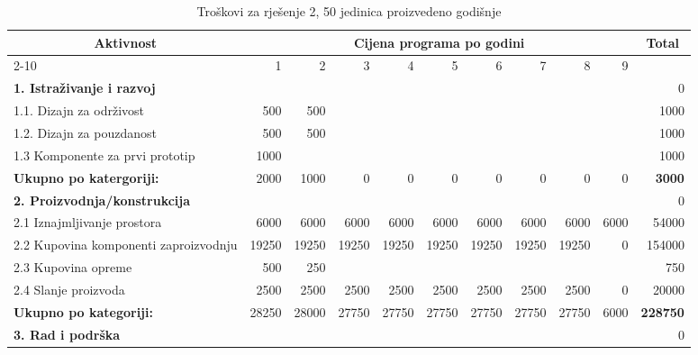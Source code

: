 \documentclass[12pt]{article}
\begin{document}
\begin{landscape}
\begin{table}[htbp]
  \centering
  \small
  \caption{Troškovi za rješenje 2, 50 jedinica proizvedeno godišnje}
    \begin{tabular}{lrrrrrrrrrr}
    \toprule
    \multicolumn{1}{c}{\multirow{2}[4]{*}{Aktivnost}} & \multicolumn{9}{c}{Cijena programa po godini}                         & \multicolumn{1}{c}{\multirow{2}[4]{*}{Total}} \\
\cmidrule{2-10}          & 1     & 2     & 3     & 4     & 5     & 6     & 7     & 8     & 9     &  \\
    \midrule
    \textbf{1. Istraživanje i razvoj} &       &       &       &       &       &       &       &       &       & 0 \\
    1.1. Dizajn za održivost & 500   & 500   &       &       &       &       &       &       &       & 1000 \\
    1.2. Dizajn za pouzdanost & 500   & 500   &       &       &       &       &       &       &       & 1000 \\
    1.3 Komponente za prvi prototip & 1000  &       &       &       &       &       &       &       &       & 1000 \\
    \midrule
    \textbf{Ukupno po katergoriji:} & 2000  & 1000  & 0     & 0     & 0     & 0     & 0     & 0     & 0     & \textbf{3000} \\
    \midrule
    \textbf{2. Proizvodnja/konstrukcija} &       &       &       &       &       &       &       &       &       & 0 \\
    2.1 Iznajmljivanje prostora & 6000  & 6000  & 6000  & 6000  & 6000  & 6000  & 6000  & 6000  & 6000  & 54000 \\
    \multicolumn{1}{p{14.715em}}{2.2 Kupovina komponenti za\newline{}proizvodnju} & 19250 & 19250 & 19250 & 19250 & 19250 & 19250 & 19250 & 19250 & 0     & 154000 \\
    2.3 Kupovina opreme & 500   & 250   &       &       &       &       &       &       &       & 750 \\
    2.4 Slanje proizvoda & 2500  & 2500  & 2500  & 2500  & 2500  & 2500  & 2500  & 2500  & 0     & 20000 \\
    \midrule
    \textbf{Ukupno po kategoriji:} & 28250 & 28000 & 27750 & 27750 & 27750 & 27750 & 27750 & 27750 & 6000  & \textbf{228750} \\
    \midrule
    \textbf{3. Rad i podrška} &       &       &       &       &       &       &       &       &       & 0 \\

\end{tabular}
\end{table}
\end{landscape}
\end{document}
